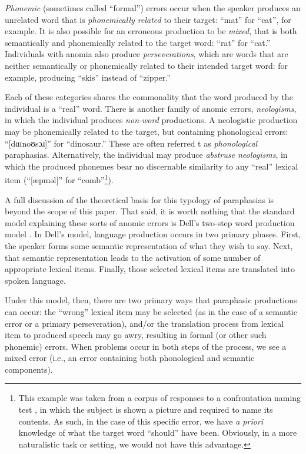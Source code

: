 \emph{Phonemic} (sometimes called ``formal'') errors occur when the speaker produces an unrelated word that is \emph{phonemically related} to their target: ``mat'' for ``cat'', for example.
It is also possible for an erroneous production to be \emph{mixed}, that is both semantically and phonemically related to the target word: ``rat'' for ``cat.''
Individuals with anomia also produce \emph{perseverations}, which are words that are neither semantically or phonemically related to their intended target word: for example, producing ``skis'' instead of ``zipper.''

Each of these categories shares the commonality that the word produced by the individual is a ``real'' word. There is another family of anomic errors, \emph{neologisms}, in which the individual produces \emph{non-word} productions.
A neologistic production may be phonemically related to the target, but containing phonological errors: ``[dɑɪnoʊsɔɹ]'' for ``dinosaur.''
These are often referred t as \emph{phonological} paraphasias.
Alternatively, the individual may produce \emph{abstruse neologisms}, in which the produced phonemes bear no discernable similarity to any ``real'' lexical item (``[æpməl]'' for ``comb''\footnote{This example was taken from a corpus of responses to a confrontation naming test \cite{Mirman:2010cd}, in which the subject is shown a picture and required to name its contents. As such, in the case of this specific error, we have \emph{a priori} knowledge of what the target word ``should'' have been. Obviously, in a more naturalistic task or setting, we would not have this advantage.}).

A full discussion of the theoretical basis for this typology of paraphasias is beyond the scope of this paper.
That said, it is worth nothing that the standard model explaining these sorts of anomic errors is Dell's two-step word production model \cite{Dell:1997wj,Dell:1986vk}.
In Dell's model, language production occurs in two primary phases.
First, the speaker forms some semantic representation of what they wish to say.
Next, that semantic representation leads to the activation of some number of appropriate lexical items.
Finally, those selected lexical items are translated into spoken language.

Under this model, then, there are two primary ways that paraphasic productions can occur: the ``wrong'' lexical item may be selected (as in the case of a semantic error or a primary perseveration), and/or the translation process from lexical item to produced speech may go awry, resulting in formal (or other such phonemic) errors.
When problems occur in both steps of the process, we see a mixed error (i.e., an error containing both phonological and semantic components).

